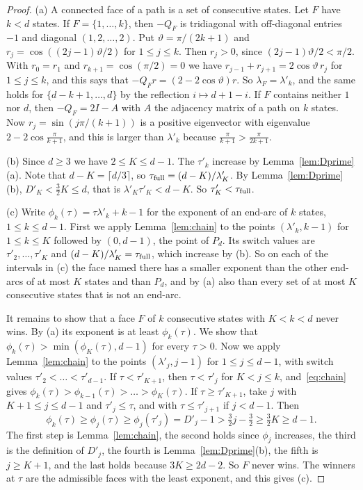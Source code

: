 \documentclass[EJP,preprint]{ejpecp}
\begin{document}
\begin{proof}
(a) A connected face of a path is a set of consecutive states. Let $F$ have
$k<d$ states. If $F=\{1,\dots,k\}$, then $-Q_F$ is tridiagonal with
off-diagonal entries $-1$ and diagonal $(1,2,\dots,2)$. Put
$\vartheta=\pi/(2k+1)$ and $r_j=\cos((2j-1)\vartheta/2)$ for $1\le j\le k$.
Then $r_j>0$, since $(2j-1)\vartheta/2<\pi/2$. With $r_0=r_1$ and
$r_{k+1}=\cos(\pi/2)=0$ we have $r_{j-1}+r_{j+1}=2\cos\vartheta\,r_j$ for
$1\le j\le k$, and this says that $-Q_Fr=(2-2\cos\vartheta)r$. So
$\lambda_F=\lambda'_k$, and the same holds for $\{d-k+1,\dots,d\}$ by the
reflection $i\mapsto d+1-i$. If $F$ contains neither $1$ nor $d$, then
$-Q_F=2I-A$ with $A$ the adjacency matrix of a path on $k$ states. Now
$r_j=\sin(j\pi/(k+1))$ is a positive eigenvector with eigenvalue
$2-2\cos\frac\pi{k+1}$, and this is larger than $\lambda'_k$ because
$\frac\pi{k+1}>\frac\pi{2k+1}$.

(b) Since $d\ge3$ we have $2\le K\le d-1$. The $\tau'_k$ increase by
Lemma~\ref{lem:Dprime}(a). Note that $d-K=\lceil d/3\rceil$, so
$\tau_{\rm full}=(d-K)/\lambda'_K$. By Lemma~\ref{lem:Dprime}(b),
$D'_K<\frac32K\le d$, that is $\lambda'_K\tau'_K<d-K$. So
$\tau'_K<\tau_{\rm full}$.

(c) Write $\phi_k(\tau)=\tau\lambda'_k+k-1$ for the exponent of an end-arc of
$k$ states, $1\le k\le d-1$. First we apply Lemma~\ref{lem:chain} to the
points $(\lambda'_k,k-1)$ for $1\le k\le K$ followed by $(0,d-1)$, the point
of $P_d$. Its switch values are $\tau'_2,\dots,\tau'_K$ and
$(d-K)/\lambda'_K=\tau_{\rm full}$, which increase by (b). So on each of the
intervals in (c) the face named there has a smaller exponent than the other
end-arcs of at most $K$ states and than $P_d$, and by (a) also than every set
of at most $K$ consecutive states that is not an end-arc.

It remains to show that a face $F$ of $k$ consecutive states with
$K<k<d$ never wins. By (a) its exponent is at least $\phi_k(\tau)$. We show that
$\phi_k(\tau)>\min(\phi_K(\tau),d-1)$ for every $\tau>0$. Now we apply
Lemma~\ref{lem:chain} to the points $(\lambda'_j,j-1)$ for $1\le j\le d-1$,
with switch values $\tau'_2<\dots<\tau'_{d-1}$. If $\tau<\tau'_{K+1}$, then
$\tau<\tau'_j$ for $K<j\le k$, and~\eqref{eq:chain} gives
$\phi_k(\tau)>\phi_{k-1}(\tau)>\dots>\phi_K(\tau)$. If $\tau\ge\tau'_{K+1}$, take $j$
with $K+1\le j\le d-1$ and $\tau'_j\le\tau$, and with $\tau\le\tau'_{j+1}$ if
$j<d-1$. Then
\[
 \phi_k(\tau)\ge \phi_j(\tau)\ge \phi_j(\tau'_j)=D'_j-1>\tfrac32j-\tfrac32
 \ge\tfrac32K\ge d-1 .
\]
The first step is Lemma~\ref{lem:chain}, the second holds since $\phi_j$
increases, the third is the definition of $D'_j$, the fourth is
Lemma~\ref{lem:Dprime}(b), the fifth is $j\ge K+1$, and the last holds because
$3K\ge2d-2$. So $F$ never wins. The winners at $\tau$ are the admissible faces with the
least exponent, and this gives (c).
\end{proof}
\end{document}
